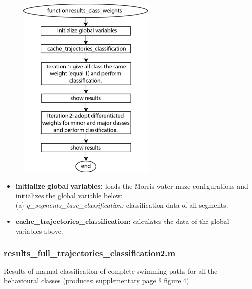 \documentclass[12pt,titlepage]{article}
\begin{document}
\begin{doublespace}
\begin{figure}[H]
	\begin{center}
		\includegraphics[width=0.6\textwidth]{results_class_weights.jpg}
		\label{stable2}
	\end{center}
\end{figure}

\begin{itemize}
	\item\textbf{initialize global variables:} loads the Morris water maze configurations and initializes the global variable below:\\
	(a) \textit{g\_segments\_base\_classification:} classification data of all segments.
	\item\textbf{cache\_trajectories\_classification:}  calculates the data of the global variables above.
\end{itemize}
	
\subsubsection{results\_full\_trajectories\_classification2.m}
Results of manual classification of complete swimming paths for all the behavioural classes (produces: supplementary page 8 figure 4).


\end{doublespace}
\end{document}
